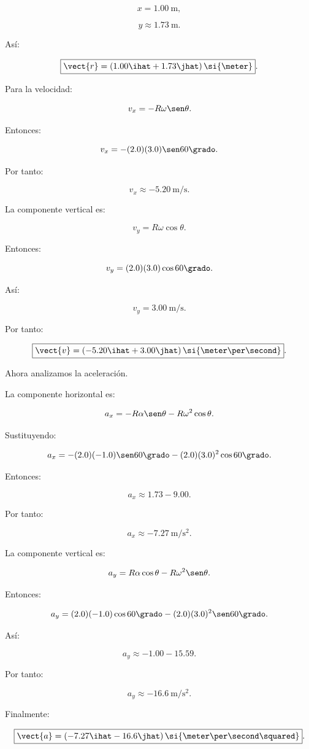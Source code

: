 \[
x=\SI{1.00}{\meter},
\]

\[
y\approx\SI{1.73}{\meter}.
\]

Así:

\[
\boxed{
\vect{r}
=
(1.00\ihat+1.73\jhat)\,\si{\meter}
}.
\]

Para la velocidad:

\[
v_x=-R\omega\sen\theta.
\]

Entonces:

\[
v_x
=
-(2.0)(3.0)\sen60\grado.
\]

Por tanto:

\[
v_x\approx
-\SI{5.20}{\meter\per\second}.
\]

La componente vertical es:

\[
v_y=R\omega\cos\theta.
\]

Entonces:

\[
v_y
=
(2.0)(3.0)\cos60\grado.
\]

Así:

\[
v_y=\SI{3.00}{\meter\per\second}.
\]

Por tanto:

\[
\boxed{
\vect{v}
=
(-5.20\ihat+3.00\jhat)
\,\si{\meter\per\second}
}.
\]

Ahora analizamos la aceleración.

La componente horizontal es:

\[
a_x
=
-R\alpha\sen\theta-R\omega^2\cos\theta.
\]

Sustituyendo:

\[
a_x
=
-(2.0)(-1.0)\sen60\grado
-
(2.0)(3.0)^2\cos60\grado.
\]

Entonces:

\[
a_x
\approx
1.73-9.00.
\]

Por tanto:

\[
a_x
\approx
-\SI{7.27}{\meter\per\second\squared}.
\]

La componente vertical es:

\[
a_y
=
R\alpha\cos\theta-R\omega^2\sen\theta.
\]

Entonces:

\[
a_y
=
(2.0)(-1.0)\cos60\grado
-
(2.0)(3.0)^2\sen60\grado.
\]

Así:

\[
a_y
\approx
-1.00-15.59.
\]

Por tanto:

\[
a_y
\approx
-\SI{16.6}{\meter\per\second\squared}.
\]

Finalmente:

\[
\boxed{
\vect{a}
=
(-7.27\ihat-16.6\jhat)
\,\si{\meter\per\second\squared}
}.
\]

